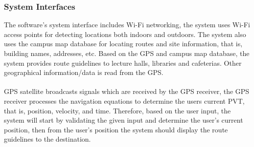 \documentclass{article}
\begin{document}
		\subsubsection{System Interfaces}
The software’s system interface includes Wi-Fi networking, the system uses Wi-Fi access points for detecting locations both indoors and outdoors. 
The system also uses the campus map database for locating routes and site information, that is, building names, addresses, etc. 
Based on the GPS and campus map database, the system provides route guidelines to lecture halls, libraries and cafeterias. 
Other geographical information/data is read from the GPS.\\\\
GPS satellite broadcasts signals which are received by the GPS receiver, the GPS receiver processes the navigation equations 
to determine the users current PVT, that is, position, velocity, and time. Therefore, based on the user input, the system will start by validating 
the given input and determine the user’s current position, then from the user’s position the system should display the route guidelines to the destination.\\
\end{document}
